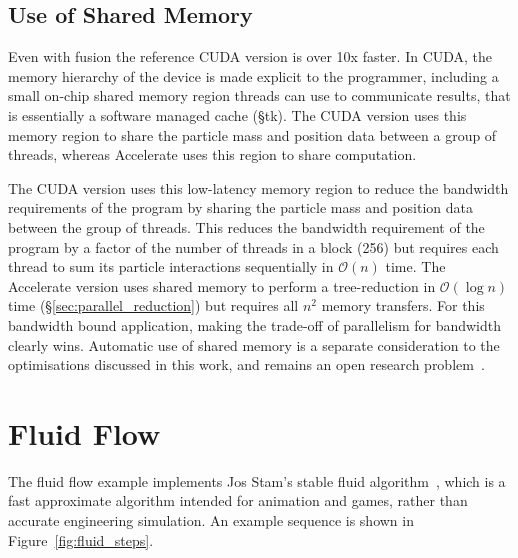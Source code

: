 \subsection{Use of Shared Memory}

Even with fusion the reference CUDA version is over 10x faster. In CUDA, the
memory hierarchy of the device is made explicit to the programmer, including a
small on-chip shared memory region threads can use to communicate results, that
is essentially a software managed cache (\S tk). The CUDA version uses this
memory region to share the particle mass and position data between a group of
threads, whereas Accelerate uses this region to share computation.

The CUDA version uses this low-latency memory region to reduce the bandwidth
requirements of the program by sharing the particle mass and position data
between the group of threads. This reduces the bandwidth requirement of the
program by a factor of the number of threads in a block (256) but requires each
thread to sum its particle interactions sequentially in $\mathcal{O}\left( n
\right)$ time. The Accelerate version uses shared memory to perform a
tree-reduction in $\mathcal{O}\left( \log n \right)$ time
(\S\ref{sec:parallel_reduction}) but requires all $n^{2}$ memory transfers. For
this bandwidth bound application, making the trade-off of parallelism for
bandwidth clearly wins. Automatic use of shared memory is a separate
consideration to the optimisations discussed in this work, and remains an open
research problem~\cite{Ma:2010ft}.


\section{Fluid Flow}
\label{sec:fluid}

The fluid flow example implements Jos Stam's stable fluid
algorithm~\cite{Stam:1999ey}, which is a fast approximate algorithm intended for
animation and games, rather than accurate engineering simulation. An example
sequence is shown in Figure~\ref{fig:fluid_steps}.

